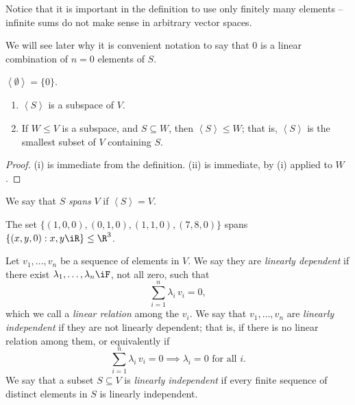 Notice that it is important in the definition to use only finitely many elements -- infinite sums do not make sense in arbitrary vector spaces.

We will see later why it is convenient notation to say that 0 is a linear combination of $n=0$ elements of $S$. 

\begin{example}
	$\left\langle \emptyset \right\rangle=\{0\}$. %
\end{example}

\begin{lemma}
\mbox{}
\begin{enumerate}
	\shortskip
	\item $\left\langle S \right\rangle$ is a subspace of $V$.
	\item If $W\leq V$ is a subspace, and $S\subseteq W$, then $\left\langle S \right\rangle\leq W$; that is, $\left\langle S \right\rangle$ is the smallest subset of $V$ containing $S$. %
\end{enumerate} %
\end{lemma}

\begin{proof}
	(i) is immediate from the definition. (ii) is immediate, by (i) applied to $W$. %
\end{proof}

\begin{definition}
	We say that $S$ \emph{spans} $V$ if $\left\langle S \right\rangle=V$. %
\end{definition}

\begin{example}
	The set $\{(1,0,0),(0,1,0),(1,1,0),(7,8,0)\}$ spans $\left\{(x,y,0) : x,y\iR \right\}\leq \R^3$. %
\end{example}

\begin{definition}
	Let $v_1,\ldots,v_n$ be a sequence of elements in $V$. We say they are \emph{linearly dependent} if there exist $\lambda_1,\ldots,\lambda_n\iF$, not all zero, such that %
	\begin{equation*}
		\sum_{i=1}^n \lambda_i \, v_i = 0,
	\end{equation*}
	which we call a \emph{linear relation} among the $v_i$. We say that $v_1,\ldots,v_n$ are \emph{linearly independent} if they are not linearly dependent; that is, if there is no linear relation among them, or equivalently if %
	\begin{equation*}
		\sum_{i=1}^n \lambda_i \, v_i = 0 \implies \lambda_i = 0 \text{ for all } i. %
	\end{equation*}
	We say that a subset $S\subseteq V$ is \emph{linearly independent} if every finite sequence of distinct elements in $S$ is linearly independent. %
\end{definition}

